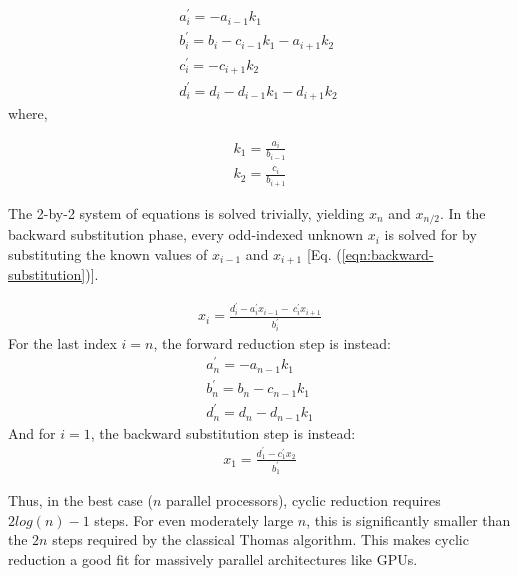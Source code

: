\documentclass{elsarticle}
\begin{document}
\begin{align} 
& a^{\prime}_i = -a_{i-1}k_1 \
    \label{eqn:forward-reduction-1}& \\
& b^{\prime}_i = b_i - c_{i-1}k_1 - a_{i+1}k_2 \
    \label{eqn:forward-reduction-2}& \\
& c^{\prime}_i = -c_{i+1}k_2 \
    \label{eqn:forward-reduction-3}& \\
& d^{\prime}_i = d_i - d_{i-1}k_1  - d_{i+1}k_2 \
    \label{eqn:forward-reduction-4}&
\end{align}
%
where,

\begin{align}
& k_1 = \frac{a_i}{b_{i-1}} \label{eqn:k1-update}& \\
& k_2 = \frac{c_i}{b_{i+1}} \label{eqn:k2-update}&
\end{align}

The 2-by-2 system of equations is solved trivially,
yielding $x_n$ and $x_{n/2}$.
In the backward substitution phase,
every odd-indexed unknown $x_i$ is solved for by
substituting the known values of $x_{i-1}$ and $x_{i+1}$
[Eq. (\ref{eqn:backward-substitution})].

\begin{align} \label{eqn:backward-substitution}
x_i = \frac{d^{\prime}_i - a^{\prime}_ix_{i-1} - \
    c^{\prime}_ix_{i+1}}{b^{\prime}_i}
\end{align}
%
For the last index $i=n$,
the forward reduction step is instead:
\begin{align} \label{eqn:forward-reduction-last}
    & a^{\prime}_n = -a_{n-1}k_1 & \\
    & b^{\prime}_n = b_n - c_{n-1}k_1 & \\
    & d^{\prime}_n = d_n - d_{n-1}k_1&
\end{align}
%
And for $i=1$, the backward substitution step is instead:
\begin{align} \label{eqn:backward-substitution-first}
x_1 = \frac{d^{\prime}_1 - c^{\prime}_1x_{2}}{b^{\prime}_1}
\end{align}

Thus, in the best case ($n$ parallel processors),
cyclic reduction requires 
$2log(n) - 1$ steps.
For even moderately large $n$,
this is significantly smaller than
the $2n$ steps required by the classical Thomas algorithm.
This makes cyclic reduction a good fit
for massively parallel architectures like GPUs.
\end{document}
